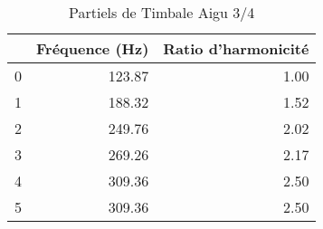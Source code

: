\begin{table}
\centering
\caption{Partiels de Timbale Aigu 3/4}
\label{table:partiels-timbale-aigu-3.wav}
\begin{tabular}{lrr}
\toprule
{} &  Fréquence (Hz) &  Ratio d'harmonicité \\
\midrule
0 &          123.87 &                 1.00 \\
1 &          188.32 &                 1.52 \\
2 &          249.76 &                 2.02 \\
3 &          269.26 &                 2.17 \\
4 &          309.36 &                 2.50 \\
5 &          309.36 &                 2.50 \\
\bottomrule
\end{tabular}
\end{table}
